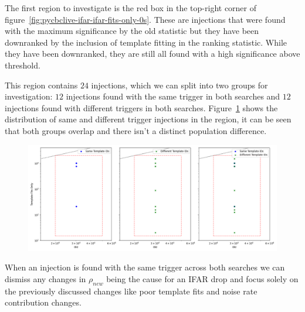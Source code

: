 The first region to investigate is the red box in the top-right corner of figure~\ref{fig:pycbclive-ifar-ifar-fits-only-0s}. These are injections that were found with the maximum significance by the old statistic but they have been downranked by the inclusion of template fitting in the ranking statistic. While they have been downranked, they are still all found with a high significance above threshold. 

This region contains $24$ injections, which we can split into two groups for investigation: $12$ injections found with the same trigger in both searches and $12$ injections found with different triggers in both searches. Figure~\ref{fig:pycbclive-top-right-region} shows the distribution of same and different trigger injections in the region, it can be seen that both groups overlap and there isn't a distinct population difference.
%
\begin{figure}
       \centering
    \includegraphics[width=1\textwidth]{images/5_pycbclive/ifar_vs_ifar_subplots.png}
    \caption{}
    \label{fig:pycbclive-top-right-region}
\end{figure}
%
When an injection is found with the same trigger across both searches we can dismiss any changes in $\rho_{new}$ being the cause for an IFAR drop and focus solely on the previously discussed changes like poor template fits and noise rate contribution changes.

